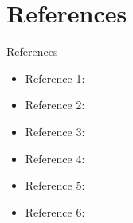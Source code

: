 \documentclass[10pt]{beamer}
\begin{document}
\section{References}
\begin{frame}{References}
    \begin{itemize}
        \item Reference 1: \cite{ieee_forecasting}
        \item Reference 2: \cite{sciencedirect_weather}
        \item Reference 3: \cite{numerical_analysis}
        \item Reference 4: \cite{arxiv_time_series}
        \item Reference 5: \cite{trapezoidal_area_analysis}
        \item Reference 6: \cite{harvard_unit27}
    \end{itemize}
\end{frame}
\end{document}
